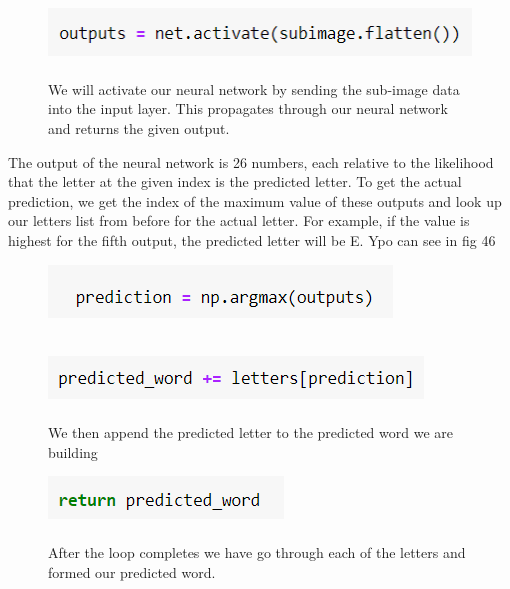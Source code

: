 \documentclass[onecolumn]{article}
\begin{document}
\begin{figure}[h]
    \centering
    \includegraphics[width=.5\linewidth]{45..png}
\caption{\label{fig:demo-bad}
\centering
\\We will activate our neural network by sending the sub-image data into the input
layer. This propagates through our neural network and returns the given output.}
\end{figure}

\begin{t}
The output of the neural network is 26 numbers, each relative to the likelihood that
the letter at the given index is the predicted letter. To get the actual prediction, we
get the index of the maximum value of these outputs and look up our letters list
from before for the actual letter. For example, if the value is highest for the fifth
output, the predicted letter will be E. Ypo can see in fig 46
\end{t}

\begin{figure}[hb!]
    \centering
    \includegraphics[width=.4\linewidth]{46..png}
\caption{\label{fig:demo-bad}
\\}
\end{figure}

\begin{figure}[hb!]
    \centering
    \includegraphics[width=.5\linewidth]{47..png}
\caption{\label{fig:demo-bad}
\centering
\\We then append the predicted letter to the predicted word we are building}
\end{figure}


\begin{figure}[hb!]
    \centering
    \includegraphics[width=.3\linewidth]{48..png}
\caption{\label{fig:demo-bad}
\centering
\\After the loop completes we have go through each of the letters and formed our predicted word. }
\end{figure}
\end{document}
